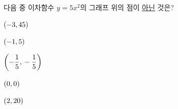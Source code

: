 다음 중 이차함수 $y=5x^2$의 그래프 위의 점이 \underline{아닌} 것은?
\begin{choices32}{\rule[-3ex]{0pt}{8ex}$(-3{,}\mkern3mu 45)$}{\rule[-3ex]{0pt}{8ex}$(-1{,}\mkern3mu 5)$}{\rule[-3ex]{0pt}{8ex}$\left(-\dfrac{1}{5}{,}\mkern3mu -\dfrac{1}{5}\right)$}{\rule[-3ex]{0pt}{8ex}$(0{,}\mkern3mu 0)$}{\rule[-3ex]{0pt}{8ex}$(2{,}\mkern3mu 20)$}\end{choices32}

